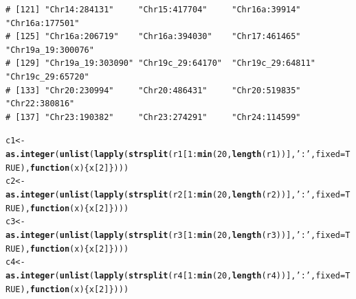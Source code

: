 \documentclass{article}\usepackage[]{graphicx}\usepackage[]{color}
\makeatletter
\newcommand{\hlnum}[1]{\textcolor[rgb]{0.686,0.059,0.569}{#1}}%
\newcommand{\hlstr}[1]{\textcolor[rgb]{0.192,0.494,0.8}{#1}}%
\newcommand{\hlopt}[1]{\textcolor[rgb]{0,0,0}{#1}}%
\newcommand{\hlstd}[1]{\textcolor[rgb]{0.345,0.345,0.345}{#1}}%
\newcommand{\hlkwa}[1]{\textcolor[rgb]{0.161,0.373,0.58}{\textbf{#1}}}%
\newcommand{\hlkwb}[1]{\textcolor[rgb]{0.69,0.353,0.396}{#1}}%
\newcommand{\hlkwc}[1]{\textcolor[rgb]{0.333,0.667,0.333}{#1}}%
\newcommand{\hlkwd}[1]{\textcolor[rgb]{0.737,0.353,0.396}{\textbf{#1}}}%
\newenvironment{kframe}{%
 \def\at@end@of@kframe{}%
 \ifinner\ifhmode%
  \def\at@end@of@kframe{\end{minipage}}%
  \begin{minipage}{\columnwidth}%
 \fi\fi%
 \def\FrameCommand##1{\hskip\@totalleftmargin \hskip-\fboxsep
 \colorbox{shadecolor}{##1}\hskip-\fboxsep
     \hskip-\linewidth \hskip-\@totalleftmargin \hskip\columnwidth}%
 \MakeFramed {\advance\hsize-\width
   \@totalleftmargin\z@ \linewidth\hsize
   \@setminipage}}%
 {\par\unskip\endMakeFramed%
 \at@end@of@kframe}
\newenvironment{knitrout}{}{} %
\makeatother
\begin{document}
\begin{knitrout}
\begin{kframe}
\begin{verbatim}
# [121] "Chr14:284131"     "Chr15:417704"     "Chr16a:39914"     "Chr16a:177501"   
# [125] "Chr16a:206719"    "Chr16a:394030"    "Chr17:461465"     "Chr19a_19:300076"
# [129] "Chr19a_19:303090" "Chr19c_29:64170"  "Chr19c_29:64811"  "Chr19c_29:65720" 
# [133] "Chr20:230994"     "Chr20:486431"     "Chr20:519835"     "Chr22:380816"    
# [137] "Chr23:190382"     "Chr23:274291"     "Chr24:114599"
\end{verbatim}
\begin{alltt}
\hlstd{c1} \hlkwb{<-} \hlkwd{as.integer}\hlstd{(}\hlkwd{unlist}\hlstd{(}\hlkwd{lapply}\hlstd{(}\hlkwd{strsplit}\hlstd{(r1[}\hlnum{1}\hlopt{:}\hlkwd{min}\hlstd{(}\hlnum{20}\hlstd{,}\hlkwd{length}\hlstd{(r1))],}\hlstr{':'}\hlstd{,}\hlkwc{fixed}\hlstd{=}\hlnum{TRUE}\hlstd{),}\hlkwa{function}\hlstd{(}\hlkwc{x}\hlstd{)\{x[}\hlnum{2}\hlstd{]\})))}
\hlstd{c2} \hlkwb{<-} \hlkwd{as.integer}\hlstd{(}\hlkwd{unlist}\hlstd{(}\hlkwd{lapply}\hlstd{(}\hlkwd{strsplit}\hlstd{(r2[}\hlnum{1}\hlopt{:}\hlkwd{min}\hlstd{(}\hlnum{20}\hlstd{,}\hlkwd{length}\hlstd{(r2))],}\hlstr{':'}\hlstd{,}\hlkwc{fixed}\hlstd{=}\hlnum{TRUE}\hlstd{),}\hlkwa{function}\hlstd{(}\hlkwc{x}\hlstd{)\{x[}\hlnum{2}\hlstd{]\})))}
\hlstd{c3} \hlkwb{<-} \hlkwd{as.integer}\hlstd{(}\hlkwd{unlist}\hlstd{(}\hlkwd{lapply}\hlstd{(}\hlkwd{strsplit}\hlstd{(r3[}\hlnum{1}\hlopt{:}\hlkwd{min}\hlstd{(}\hlnum{20}\hlstd{,}\hlkwd{length}\hlstd{(r3))],}\hlstr{':'}\hlstd{,}\hlkwc{fixed}\hlstd{=}\hlnum{TRUE}\hlstd{),}\hlkwa{function}\hlstd{(}\hlkwc{x}\hlstd{)\{x[}\hlnum{2}\hlstd{]\})))}
\hlstd{c4} \hlkwb{<-} \hlkwd{as.integer}\hlstd{(}\hlkwd{unlist}\hlstd{(}\hlkwd{lapply}\hlstd{(}\hlkwd{strsplit}\hlstd{(r4[}\hlnum{1}\hlopt{:}\hlkwd{min}\hlstd{(}\hlnum{20}\hlstd{,}\hlkwd{length}\hlstd{(r4))],}\hlstr{':'}\hlstd{,}\hlkwc{fixed}\hlstd{=}\hlnum{TRUE}\hlstd{),}\hlkwa{function}\hlstd{(}\hlkwc{x}\hlstd{)\{x[}\hlnum{2}\hlstd{]\})))}


\end{alltt}
\end{kframe}
\end{knitrout}
\end{document}
